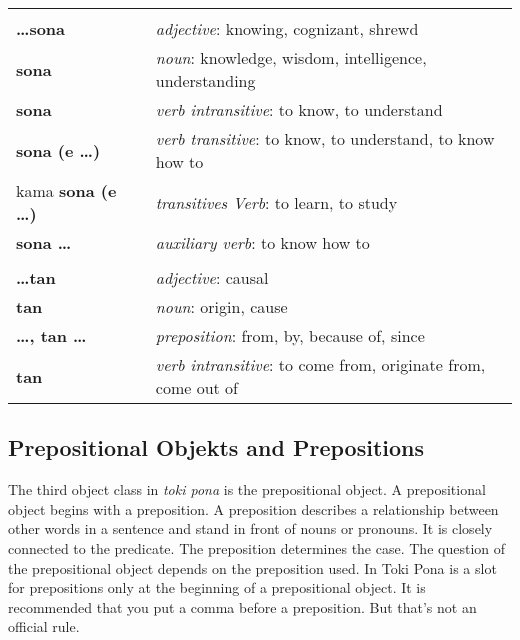 \begin{supertabular}{p{2,5cm}|ll}
                                 &  &                                                                               \\ %
    \textbf{\dots sona}          &  & \textit{adjective}: knowing, cognizant, shrewd                                \\ %
    \textbf{sona}                &  & \textit{noun}: knowledge, wisdom, intelligence, understanding                 \\ %
    \textbf{sona}                &  & \textit{verb intransitive}: to know, to understand                            \\ %
    \textbf{sona (e \dots)}      &  & \textit{verb transitive}: to know, to understand, to know how to              \\ %
    kama \textbf{sona (e \dots)} &  & \textit{transitives Verb}: to learn, to study                                 \\ %
    \textbf{sona \dots}          &  & \textit{auxiliary verb}: to know how to                                       \\ %
                                 &  &                                                                               \\ %
    \textbf{\dots tan}           &  & \textit{adjective}: causal                                                    \\ %
    \textbf{tan}                 &  & \textit{noun}: origin, cause                                                  \\ %
    \textbf{\dots , tan \dots}   &  & \textit{preposition}: from, by, because of, since                             \\ %
    \textbf{tan}                 &  & \textit{verb intransitive}: to come from, originate from, come out of         \\ %
\end{supertabular}
%
\newpage
%
\subsection*{Prepositional Objekts and Prepositions}
%
%
The third object class in \textit{toki pona} is the prepositional object.
A prepositional object begins with a preposition.
A preposition describes a relationship between other words in a sentence and stand in front of nouns or pronouns.
It is closely connected to the predicate.
The preposition determines the case.
The question of the prepositional object depends on the preposition used.
In Toki Pona is a slot for prepositions only at the beginning of a prepositional object.
It is recommended that you put a comma before a preposition.
But that's not an official rule.

